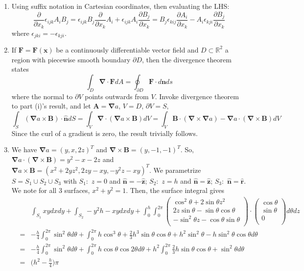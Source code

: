 \documentclass[a4paper]{article}
\begin{document}
\begin{ans}\leavevmode
\begin{enumerate}[label=(\roman*)]
    \item Using suffix notation in Cartesian coordinates, then evaluating the LHS:
$$\frac{\partial}{\partial x_k}\epsilon_{ijk}A_iB_j=\epsilon_{ijk}B_j\frac{\partial}{\partial x_k}A_i+\epsilon_{ijk}A_i\frac{\partial B_j}{\partial x_k}=B_j\epsilon_{kij}\frac{\partial A_i}{\partial x_k}-A_i\epsilon_{kji}\frac{\partial B_j}{\partial x_k}$$
 where $\epsilon_{jki}=-\epsilon_{kji}$.
\item If $\mathbf{F}=\mathbf{F}(\mathbf{x})$ be a continuously differentiable vector field and $D\subset\mathbb{R}^2$ a region with piecewise smooth boundary $\partial D$, then the divergence theorem states
$$ \int_D\boldsymbol{\nabla}\cdot\mathbf{F}dA=\oint_{\partial D}\mathbf{F}\cdot d\mathbf{n}ds$$
where the normal to $\partial V$ points outwards from $V$. Invoke divergence theorem to part (i)'s result, and let $\mathbf{A}=\boldsymbol{\nabla}a$, $V=D$, $\partial V=S$,
$$\int_S(\boldsymbol{\nabla}a\times\mathbf{B})\cdot\mathbf{\hat{n}}dS=\int_V\boldsymbol{\nabla}\cdot(\boldsymbol{\nabla}a\times\mathbf{B})dV=\int_V\mathbf{B}\cdot(\boldsymbol{\nabla}\times\boldsymbol{\nabla}a)-\boldsymbol{\nabla}a\cdot(\boldsymbol{\nabla}\times\mathbf{B})dV$$
Since the curl of a gradient is zero, the result trivially follows.
\item We have $\boldsymbol{\nabla}a=(y,x,2z)^T$ and $\boldsymbol{\nabla}\times\mathbf{B}=(y,-1,-1)^T$. So, $\boldsymbol{\nabla}a\cdot(\boldsymbol{\nabla}\times\mathbf{B})=y^2-x-2z$ and $\boldsymbol{\nabla}a\times\mathbf{B}=(x^2+2yz^2,2zy-xy,-y^2z-xy)^T$. We parametrize $S=S_1\cup S_2\cup S_3$ with $S_1:$ $z=0$ and $\mathbf{\hat{n}}=-\mathbf{\hat{z}}$; $S_2:$ $z=h$ and $\mathbf{\hat{n}}=\mathbf{\hat{z}}$; $S_3:$ $\mathbf{\hat{n}}=\mathbf{\hat{r}}$. We note for all 3 surfaces, $x^2+y^2=1$. Then, the surface integral gives
\begin{eqnarray}
&&\int_{S_1}xydxdy+\int_{S_2}-y^2h-xydxdy+\int_0^h\int_0^{2\pi}\begin{pmatrix}\cos^2\theta+2\sin\theta z^2\\2z\sin\theta-\sin\theta\cos\theta\\-\sin^2\theta z-\cos\theta\sin\theta\\\end{pmatrix}\cdot\begin{pmatrix}\cos\theta\\\sin\theta\\0\\\end{pmatrix}d\theta dz\nonumber\\&=&-\frac{h}{4}\int_0^{2\pi}\sin^2\theta d\theta+\int_0^{2\pi}h\cos^3\theta+\frac{2}{3}h^3\sin\theta\cos\theta+h^2\sin^2\theta-h\sin^2\theta\cos\theta d\theta\nonumber\\&=&-\frac{h}{4}\int_0^{2\pi}\sin^2\theta d\theta+\int_0^{2\pi}h\cos\theta\cos2\theta d\theta+h^2\int_0^{2\pi}\frac{2}{3}h\sin\theta\cos\theta+\sin^2\theta d\theta\nonumber\\&=& \bigg(h^2-\frac{h}{4}\bigg)\pi\nonumber

\end{eqnarray}
\end{enumerate}
\end{ans}
\end{document}
